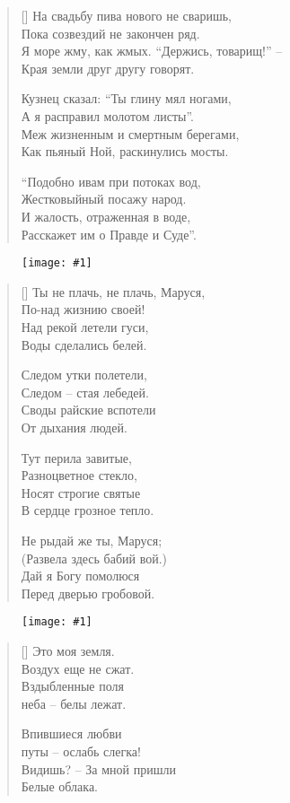 \documentclass[12pt,a5paper,twoside]{article}
\newcommand{\pict}[1]{\thispagestyle{empty}\begin{figure}[H]\begin{center}\texttt{[image: \#1]}\end{center}\end{figure}\newpage}
\begin{document}
\settowidth{\versewidth}{На свадьбу пива нового не сваришь,}
\begin{verse}[\versewidth]		
На свадьбу пива нового не сваришь,\\
Пока созвездий не закончен ряд.\\
Я море жму, как жмых. “Держись, товарищ!” –\\
Края земли друг другу говорят.

Кузнец сказал: “Ты глину мял ногами,\\
А я расправил молотом листы”.\\
Меж жизненным и смертным берегами,\\
Как пьяный Ной, раскинулись мосты.

“Подобно ивам при потоках вод,\\
Жестковыйный посажу народ.\\
И жалость, отраженная в воде,\\
Расскажет им о Правде и Суде”.
\end{verse}
\newpage
\pict{picts/Ti_ne_plach1.png} 


\settowidth{\versewidth}{Ты не плачь, не плачь, Маруся,}
\begin{verse}[\versewidth]
Ты не плачь, не плачь, Маруся,\\
По-над жизнию своей!\\
Над рекой летели гуси,\\
Воды сделались белей.

Следом утки полетели,\\
Следом – стая лебедей.\\
Своды райские вспотели\\
От дыхания людей.

Тут перила завитые,\\
Разноцветное стекло,\\
Носят строгие святые\\
В сердце грозное тепло.

Не рыдай же ты, Маруся;\\
(Развела здесь бабий вой.)\\
Дай я Богу помолюся\\
Перед дверью гробовой.
\end{verse}
\newpage
\pict{picts/Eto_moya_zemla1.png} 


\settowidth{\versewidth}{Это моя земля.}
\begin{verse}[\versewidth]
Это моя земля.\\
Воздух еще не сжат.\\
Вздыбленные поля\\
неба – белы лежат.

Впившиеся любви\\
путы – ослабь слегка!\\
Видишь? – За мной пришли\\
Белые облака.
\end{verse}
\newpage
\end{document}
